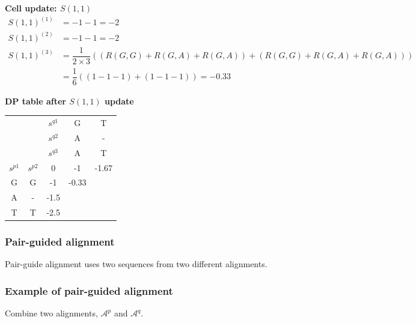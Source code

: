 %
%
\newpage

\textbf{Cell update: $S(1, 1)$} \\

$\begin{aligned}
S(1,1)^{(1)} & = -1 -1 = -2 \\
S(1,1)^{(2)} & = -1 -1 = -2 \\
S(1,1)^{(3)} & = \dfrac{1}{2\times3}((R(G,G)+R(G,A)+R(G,A))+(R(G,G)+R(G,A)+R(G,A))) \\
&=\dfrac{1}{6}((1-1-1)+(1-1-1))=-0.33
\end{aligned} $
\bigskip \bigskip 

\textbf{DP table after $S(1, 1)$ update}

\begin{table}[H]
\centering
\begin{tabular}{ccccc}
  &                        & $s^{q1}$                           & G                     & T                     \\
  &                        & $s^{q2}$                           & A                     & -                     \\
  &                        & $s^{q3}$                          & A                     & T                     \\ \cline{3-5} 
$s^{p1}$ & \multicolumn{1}{c|}{$s^{p2}$} & \multicolumn{1}{c|}{0} & \multicolumn{1}{c|}{-1} & \multicolumn{1}{c|}{-1.67} \\ \cline{3-5} 
G & \multicolumn{1}{c|}{G} & \multicolumn{1}{c|}{-1}  & \multicolumn{1}{c|}{-0.33} & \multicolumn{1}{c|}{} \\ \cline{3-5} 
A & \multicolumn{1}{c|}{-} & \multicolumn{1}{c|}{-1.5}  & \multicolumn{1}{c|}{} & \multicolumn{1}{c|}{} \\ \cline{3-5} 
T & \multicolumn{1}{c|}{T} & \multicolumn{1}{c|}{-2.5}  & \multicolumn{1}{c|}{} & \multicolumn{1}{c|}{} \\ \cline{3-5} 
\end{tabular}
\end{table}

%
%
\subsubsection*{Pair-guided alignment}
Pair-guide alignment uses two sequences from two different alignments.

%
%
\subsubsection*{Example of pair-guided alignment}
Combine two alignments, $\mathcal{A}^p$ and $\mathcal{A}^q$.


